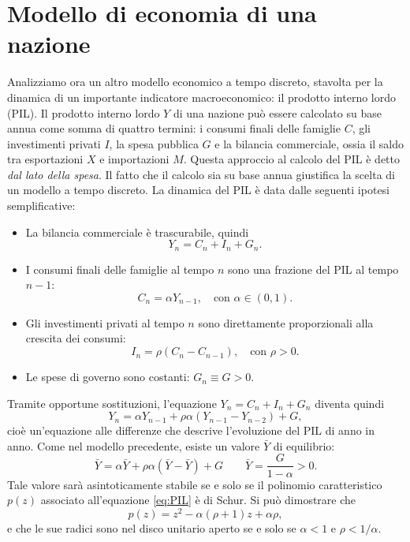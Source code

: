 \vspace{1ex}


\section{Modello di economia di una nazione}

Analizziamo ora un altro modello economico a tempo discreto,
stavolta per la dinamica di un importante indicatore macroeconomico:
il prodotto interno lordo (PIL).
Il prodotto interno lordo $Y$ di una nazione può essere calcolato
su base annua come somma di quattro termini: i consumi finali delle famiglie $C$,
gli investimenti privati $I$, la spesa pubblica $G$ e la bilancia commerciale,
ossia il saldo tra esportazioni $X$ e importazioni $M$.
Questa approccio al calcolo del PIL è detto \emph{dal lato della spesa}.
Il fatto che il calcolo sia su base annua giustifica la scelta di
un modello a tempo discreto.
La dinamica del PIL è data dalle seguenti ipotesi semplificative:
\begin{itemize}
\item La bilancia commerciale è trascurabile, quindi
	\[
	Y_n = C_n + I_n + G_n.
	\]
\item I consumi finali delle famiglie al tempo $n$ sono una frazione
	del PIL al tempo $n-1$:
	\[
	C_n = \alpha Y_{n-1}, \quad \text{con $\alpha \in (0,1)$}.
	\]
\item Gli investimenti privati al tempo $n$ sono direttamente proporzionali
	alla crescita dei consumi:
	\[
	I_n = \rho(C_n-C_{n-1}), \quad \text{con $\rho > 0$}.
	\]
\item Le spese di governo sono costanti: $G_n \equiv G > 0$.
\end{itemize}
Tramite opportune sostituzioni, l'equazione $Y_n = C_n + I_n + G_n$
diventa quindi
\begin{equation} \label{eq:PIL}
Y_n = \alpha Y_{n-1} + \rho \alpha (Y_{n-1}-Y_{n-2}) + G,
\end{equation}
cioè un'equazione alle differenze che descrive l'evoluzione del PIL di anno in anno.
Come nel modello precedente, esiste un valore $\bar{Y}$ di equilibrio:
\[
\bar{Y} = \alpha \bar{Y} + \rho \alpha (\bar{Y}-\bar{Y}) + G
\qquad \bar{Y} = \frac{G}{1-\alpha} > 0.
\]
Tale valore sarà asintoticamente stabile se e solo se il polinomio
caratteristico $p(z)$ associato all'equazione \eqref{eq:PIL} è di Schur.
Si può dimostrare che
\[
p(z) = z^2 - \alpha(\rho+1)z + \alpha\rho,
\]
e che le sue radici sono nel disco unitario aperto se e solo se
$\alpha < 1$ e $\rho < 1/\alpha$.

